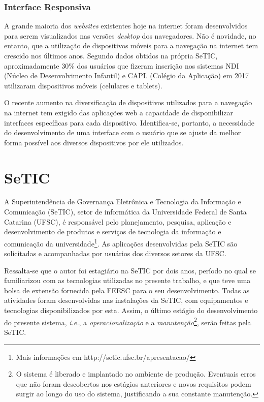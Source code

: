\documentclass[
  10.5pt,				  %
	openright,			%
	twoside,			  %
  a5paper,
  chapter=TITLE,	%
	section=TITLE,	%
  hyphens,        %
	english,        %
	brazil          %
]{abntex2}
\begin{document}
\subsubsection{Interface Responsiva}\label{sec:interface}
A grande maioria dos \emph{websites} existentes hoje na internet foram desenvolvidos para serem visualizados nas versões \emph{desktop} dos navegadores. Não é novidade, no entanto, que a utilização de dispositivos móveis para a navegação na internet tem crescido nos últimos anos. Segundo dados obtidos na própria SeTIC, aproximadamente 30\% dos usuários que fizeram inscrição nos sistemas NDI (Núcleo de Desenvolvimento Infantil) e CAPL (Colégio da Aplicação) em 2017 utilizaram dispositivos móveis (celulares e tablets). 

O recente aumento na diversificação de dispositivos utilizados para a navegação na internet tem exigido das aplicações web a capacidade de disponibilizar interfaces específicas para cada dispositivo. Identifica-se, portanto, a necessidade do desenvolvimento de uma interface com o usuário que se ajuste da melhor forma possível aos diversos dispositivos por ele utilizados.



\section{SeTIC}

A Superintendência de Governança Eletrônica e Tecnologia da Informação e Comunicação (SeTIC), setor de informática da Universidade Federal de Santa Catarina (UFSC), é responsável pelo planejamento, pesquisa, aplicação e desenvolvimento de produtos e serviços de tecnologia da informação e comunicação da universidade\footnote{Mais informações em http://setic.ufsc.br/apresentacao/}. As aplicações desenvolvidas pela SeTIC são solicitadas e acompanhadas por usuários dos diversos setores da UFSC.

Ressalta-se que o autor foi estagiário na SeTIC por dois anos, período no qual se familiarizou com as tecnologias utilizadas no presente trabalho, e que teve uma bolsa de extensão fornecida pela FEESC para o seu desenvolvimento.
Todas as atividades foram desenvolvidas nas instalações da SeTIC, com equipamentos e tecnologias disponibilizados por esta. Assim, o último estágio do desenvolvimento do presente sistema, \emph{i.e.}, a \emph{operacionalização} e a \emph{manutenção}\footnote{O sistema é liberado e implantado no ambiente de produção. Eventuais erros que não foram descobertos nos estágios anteriores e novos requisitos podem surgir ao longo do uso do sistema, justificando a sua constante manutenção.}, serão feitas pela SeTIC.
\end{document}
